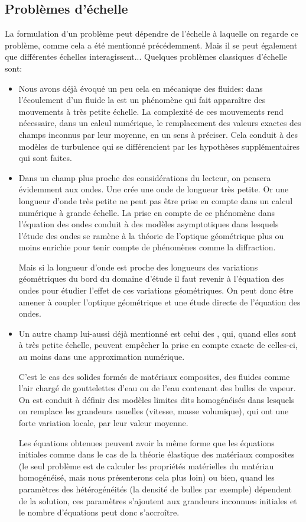 \subsection{Problèmes d'échelle}
La formulation d'un problème peut dépendre de l'échelle à laquelle on regarde ce problème, comme cela a été mentionné précédemment. Mais il se peut également que différentes échelles interagissent...
Quelques problèmes classiques d'échelle sont:
\begin{itemize}
  \item Nous avons déjà évoqué un peu cela en mécanique des fluides:
	dans l'écoulement d'un fluide la  est un phénomène qui fait apparaître des mouvements à très petite échelle. La complexité de ces mouvements rend nécessaire, dans un calcul numérique, le remplacement des valeurs exactes des champs inconnus par leur moyenne, en un sens à préciser. Cela conduit à des modèles de turbulence qui se différencient par les hypothèses supplémentaires qui sont faites.
  \item Dans un champ plus proche des considérations du lecteur, on pensera évidemment
	aux ondes.
	Une  crée une onde de longueur très petite. Or une longueur d'onde très petite ne peut pas être prise en compte dans un calcul numérique à grande échelle. La prise en compte de ce phénomène dans l'équation des ondes conduit à des modèles asymptotiques dans lesquels l'étude des ondes se ramène à la théorie de l'optique géométrique plus ou moins enrichie pour tenir compte de phénomènes comme la diffraction.

	Mais si la longueur d'onde est proche des longueurs des variations géométriques du bord du domaine d'étude il faut revenir à l'équation des ondes pour étudier l'effet de ces variations géométriques. On peut donc être amener à coupler l'optique géométrique et une étude directe de l'équation des ondes.
  \item Un autre champ lui-aussi déjà mentionné est celui des , qui, quand elles sont à très petite échelle, peuvent empêcher la prise en compte exacte de celles-ci, au moins dans une approximation numérique.

	C'est le cas des solides formés de matériaux composites, des fluides comme l'air 	chargé de gouttelettes d'eau ou de l'eau contenant des bulles de vapeur. On est conduit à définir des modèles limites dits homogénéisés dans lesquels on remplace les grandeurs usuelles (vitesse, masse volumique), qui ont une forte variation locale, par leur valeur moyenne.

	Les équations obtenues peuvent avoir la même forme que les équations initiales comme dans le cas de la théorie élastique des matériaux composites (le seul problème est de calculer les propriétés matérielles du matériau homogénéisé, mais nous présenterons cela plus loin) ou bien, quand les paramètres des hétérogénéités (la densité de bulles par exemple) dépendent de la solution, ces paramètres s'ajoutent aux grandeurs inconnues initiales et le nombre d'équations peut donc s'accroître.
\end{itemize}

